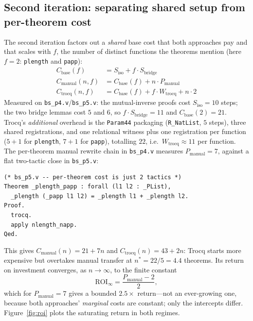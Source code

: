 \documentclass[runningheads]{llncs}
\begin{document}
\subsection{Second iteration: separating shared setup from per-theorem cost}
\label{sec:second}

The second iteration factors out a \emph{shared} base cost that both
approaches pay and that scales with $f$, the number of distinct functions the
theorems mention (here $f=2$: \texttt{plength} and \texttt{papp}):
\begin{align}
C_{\text{base}}(f) &= S_{\text{iso}} + f \cdot S_{\text{bridge}} \\
C_{\text{manual}}(n,f) &= C_{\text{base}}(f) + n \cdot P_{\text{manual}} \\
C_{\text{trocq}}(n,f) &= C_{\text{base}}(f) + f \cdot W_{\text{trocq}} + n \cdot 2
\end{align}
Measured on \texttt{bs\_p4.v}/\texttt{bs\_p5.v}: the mutual-inverse proofs
cost $S_{\text{iso}}=10$ steps; the two bridge lemmas cost $5$ and $6$, so
$f\cdot S_{\text{bridge}}=11$ and $C_{\text{base}}(2)=21$. Trocq's
\emph{additional} overhead is the \texttt{Param44} packaging
(\texttt{R\_NatList}, $5$ steps), three shared registrations, and one
relational witness plus one registration per function
($5{+}1$ for \texttt{plength}, $7{+}1$ for \texttt{papp}), totalling $22$,
i.e.\ $W_{\text{trocq}}\approx 11$ per function. The per-theorem manual
rewrite chain in \texttt{bs\_p4.v} measures $P_{\text{manual}}=7$, against a
flat two-tactic close in \texttt{bs\_p5.v}:

\begin{lstlisting}
(* bs_p5.v -- per-theorem cost is just 2 tactics *)
Theorem _plength_papp : forall (l1 l2 : _PList),
  _plength (_papp l1 l2) = _plength l1 + _plength l2.
Proof.
  trocq.
  apply nlength_napp.
Qed.
\end{lstlisting}

This gives $C_{\text{manual}}(n) = 21+7n$ and $C_{\text{trocq}}(n) = 43+2n$:
Trocq starts more expensive but overtakes manual transfer at
$n^{*}=22/5=4.4$ theorems. Its return on investment converges, as
$n\to\infty$, to the finite constant
\begin{equation}
\mathrm{ROI}_{\infty} = \frac{P_{\text{manual}} - 2}{2},
\end{equation}
which for $P_{\text{manual}}=7$ gives a bounded $2.5\times$ return---not an
ever-growing one, because both approaches' \emph{marginal} costs are
constant; only the intercepts differ. Figure~\ref{fig:roi} plots the
saturating return in both regimes.
\end{document}
